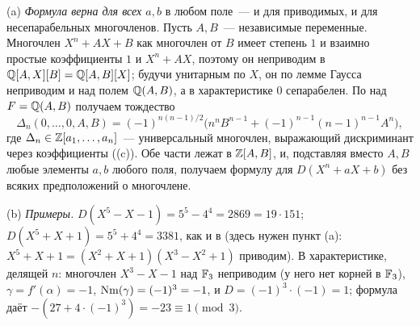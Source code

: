 \begin{remark}[5.50a]
(a) \emph{Формула верна для всех $a,b$} в любом поле~--- и для приводимых, и для несепарабельных многочленов. Пусть $A,B$~---
независимые переменные. Многочлен $X^n+AX+B$ как многочлен от $B$ имеет степень $1$ и взаимно простые коэффициенты $1$
и $X^n+AX$, поэтому он неприводим в $\mathbb Q[A,X][B]=\mathbb Q[A,B][X]$; будучи унитарным по $X$, он по лемме Гаусса неприводим и
над полем $\mathbb Q(A,B)$, а в характеристике $0$ сепарабелен. По  над $F=\mathbb Q(A,B)$ получаем тождество
\[
\Delta_n(0,\dots,0,A,B)=(-1)^{n(n-1)/2}\bigl(n^nB^{n-1}+(-1)^{n-1}(n-1)^{n-1}A^n\bigr),
\]
где $\Delta_n\in\mathbb Z[a_1,\dots,a_n]$~--- универсальный многочлен, выражающий дискриминант через коэффициенты ((c)).
Обе части лежат в $\mathbb Z[A,B]$, и, подставляя вместо $A,B$ любые элементы $a,b$ любого поля, получаем формулу для
$D(X^n+aX+b)$ без всяких предположений о многочлене.

(b) \emph{Примеры.} $D(X^5-X-1)=5^5-4^4=2869=19\cdot151$; $D(X^5+X+1)=5^5+4^4=3381$, как и в  (здесь нужен пункт (a):
$X^5+X+1=(X^2+X+1)(X^3-X^2+1)$ приводим). В характеристике, делящей $n$: многочлен $X^3-X-1$ над $\mathbb F_3$ неприводим (у
него нет корней в $\mathbb F_3$), $\gamma=f'(\alpha)=-1$, $\operatorname{Nm}(\gamma)=(-1)^3=-1$, и $D=(-1)^{3}\cdot(-1)=1$; формула даёт
$-(27+4\cdot(-1)^3)=-23\equiv1\pmod3$.
\end{remark}
